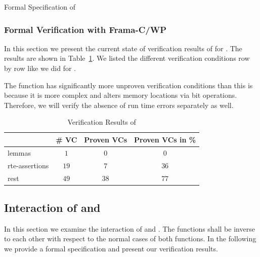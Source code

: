 \begin{listing}[hbt]
\begin{minipage}{\textwidth}

\end{minipage}
\caption{\label{fig:spec-poke} Formal Specification of \poke}
\end{listing}



\FloatBarrier

\subsubsection{Formal Verification with Frama-C/WP}
\label{verification-poke}

In this section we present the current state of verification results of 
for \poke.
The results are shown in Table~\ref{tab:results-poke}.
 We listed the different verification conditions 
 row by row like we did for \peek.

The function \poke has significantly more unproven verification conditions than \peek
this is because it is more complex and alters memory locations via bit operations.
Therefore, we will verify the absence of run time errors separately as well.

\begin{table}[hbt]
  \centering
  \begin{tabular}[h]{lccc}
    \toprule
     & \# VC & Proven VCs & Proven VCs in \%\\
    \midrule
    lemmas & $1$ &$0$ & $0$ \\
    rte-assertions&$19$&$7$&$36$\\
    rest &$49$ &$38$&$77$\\
    \bottomrule
  \end{tabular}
  \caption{Verification Results of \poke}
  \label{tab:results-poke}
\end{table}



\clearpage
\subsection{Interaction of \peek and \poke}
\label{interaction}


In this section we examine the interaction of 
\peek and \poke. The functions shall be inverse to each other
with respect to the normal cases of both functions.
In the following we provide a formal specification and present
our verification results.


